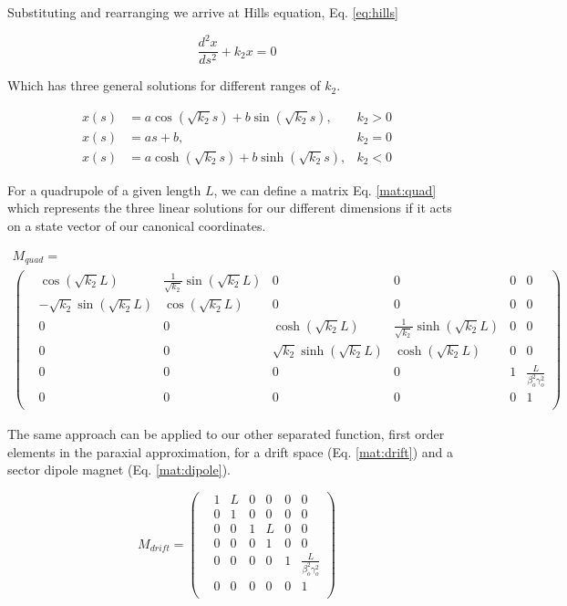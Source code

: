 Substituting and rearranging we arrive at Hills equation, Eq. \ref{eq:hills}

\begin{equation} \label{eq:hills}
	\frac{d^2 x}{ds^2} + k_2 x = 0
\end{equation}

Which has three general solutions for different ranges of $k_2$.

\begin{align} \label{eq:hillSol}
	x(s) &= a \cos{\left(\sqrt{k_2} s\right)} + b \sin{\left(\sqrt{k_2} s\right)}, &k_2>0\\
	x(s) &= a s + b, &k_2 =0 \\
	x(s) &= a \cosh{\left(\sqrt{k_2} s\right)} + b \sinh{\left(\sqrt{k_2} s\right)}, &k_2<0
\end{align}

For a quadrupole of a given length $L$, we can define a matrix Eq. \ref{mat:quad} which represents the three linear solutions for our different dimensions if it acts on a state vector of our canonical coordinates.

\begin{multline} \label{mat:quad}
	M_{quad} = \\
\begin{pmatrix} 
	&\cos{\left(\sqrt{k_2} L\right)} &\frac{1}{\sqrt{k_2}}\sin{\left(\sqrt{k_2} L\right)} &0 &0 &0 &0\\
	&-\sqrt{k_2}\sin{\left(\sqrt{k_2} L\right)} &\cos{\left(\sqrt{k_2} L\right)} &0 &0 &0 &0\\
	&0 &0 &\cosh{\left(\sqrt{k_2} L\right)} &\frac{1}{\sqrt{k_2}}\sinh{\left(\sqrt{k_2} L\right)} &0 &0\\
	&0 &0 &\sqrt{k_2}\sinh{\left(\sqrt{k_2} L\right)} &\cosh{\left(\sqrt{k_2} L\right)} &0 &0\\
	&0 &0 &0 &0 &1 &\frac{L}{\beta_o^2\gamma_o^2}\\
	&0 &0 &0 &0 &0 &1\\
\end{pmatrix}
\end{multline}

The same approach can be applied to our other separated function, first order elements in the paraxial approximation, for a drift space (Eq. \ref{mat:drift}) and a sector dipole magnet (Eq. \ref{mat:dipole}).

\begin{equation} \label{mat:drift}
	M_{drift} =
\begin{pmatrix}
	&1 &L &0 &0 &0 &0\\
	&0 &1 &0 &0 &0 &0\\
	&0 &0 &1 &L &0 &0\\
	&0 &0 &0 &1 &0 &0\\
	&0 &0 &0 &0 &1 &\frac{L}{\beta_o^2\gamma_o^2}\\
	&0 &0 &0 &0 &0 &1\\
\end{pmatrix}
\end{equation}

